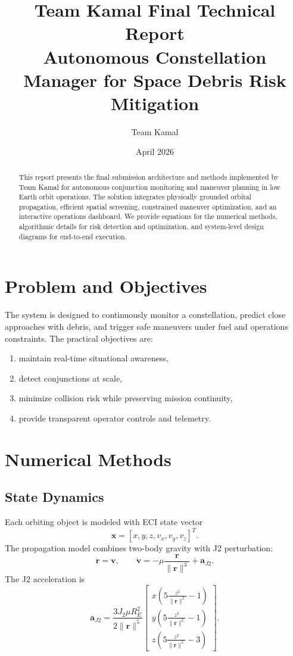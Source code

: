 \documentclass[11pt,a4paper]{article}
\title{\textbf{Team Kamal Final Technical Report}\\
\large Autonomous Constellation Manager for Space Debris Risk Mitigation}
\author{Team Kamal}
\date{April 2026}
\begin{document}
\maketitle

\begin{abstract}
This report presents the final submission architecture and methods implemented by Team Kamal for autonomous conjunction monitoring and maneuver planning in low Earth orbit operations. The solution integrates physically grounded orbital propagation, efficient spatial screening, constrained maneuver optimization, and an interactive operations dashboard. We provide equations for the numerical methods, algorithmic details for risk detection and optimization, and system-level design diagrams for end-to-end execution.
\end{abstract}

\section{Problem and Objectives}
The system is designed to continuously monitor a constellation, predict close approaches with debris, and trigger safe maneuvers under fuel and operations constraints. The practical objectives are:
\begin{enumerate}
  \item maintain real-time situational awareness,
  \item detect conjunctions at scale,
  \item minimize collision risk while preserving mission continuity,
  \item provide transparent operator controls and telemetry.
\end{enumerate}

\section{Numerical Methods}
\subsection{State Dynamics}
Each orbiting object is modeled with ECI state vector
\[
\mathbf{x} = [x,y,z,v_x,v_y,v_z]^T.
\]
The propagation model combines two-body gravity with J2 perturbation:
\[
\dot{\mathbf{r}} = \mathbf{v}, \qquad
\dot{\mathbf{v}} = -\mu\frac{\mathbf{r}}{\|\mathbf{r}\|^3} + \mathbf{a}_{J2}.
\]
The J2 acceleration is
\[
\mathbf{a}_{J2}=\frac{3J_2\mu R_E^2}{2\|\mathbf{r}\|^5}
\begin{bmatrix}
x\left(5\frac{z^2}{\|\mathbf{r}\|^2}-1\right)\\
y\left(5\frac{z^2}{\|\mathbf{r}\|^2}-1\right)\\
z\left(5\frac{z^2}{\|\mathbf{r}\|^2}-3\right)
\end{bmatrix}.
\]
\end{document}
